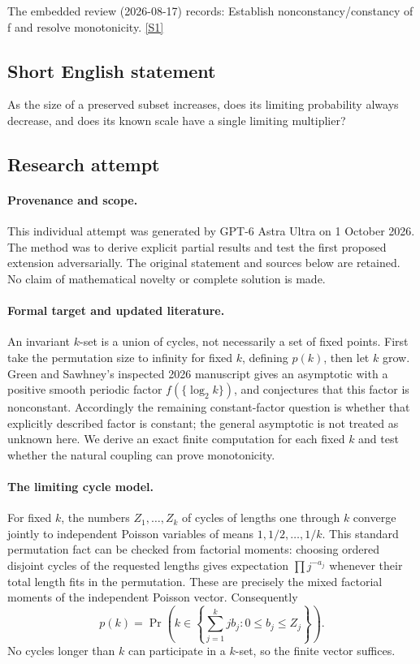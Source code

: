 \documentclass[11pt,a4paper]{article}
\newcommand{\sref}[2]{\hyperlink{source:#1:#2}{[S#2]}}
\begin{document}
The embedded review (2026-08-17) records: Establish nonconstancy/constancy of f and resolve monotonicity. \sref{statement}{1}

\subsection{Short English statement}

As the size of a preserved subset increases, does its limiting probability always decrease, and does its known scale have a single limiting multiplier?

\subsection{Research attempt}

\paragraph{Provenance and scope.}
This individual attempt was generated by GPT-6 Astra Ultra on 1 October 2026. The method was to derive explicit partial results and test the first proposed extension adversarially. The original statement and sources below are retained. No claim of mathematical novelty or complete solution is made.

\paragraph{Formal target and updated literature.}
An invariant $k$-set is a union of cycles, not necessarily a set of fixed points. First take the permutation size to infinity for fixed $k$, defining $p(k)$, then let $k$ grow. Green and Sawhney's inspected 2026 manuscript gives an asymptotic with a positive smooth periodic factor $f(\{\log_2k\})$, and conjectures that this factor is nonconstant. Accordingly the remaining constant-factor question is whether that explicitly described factor is constant; the general asymptotic is not treated as unknown here. We derive an exact finite computation for each fixed $k$ and test whether the natural coupling can prove monotonicity.

\paragraph{The limiting cycle model.}
For fixed $k$, the numbers $Z_1,\ldots,Z_k$ of cycles of lengths one through $k$ converge jointly to independent Poisson variables of means $1,1/2,\ldots,1/k$. This standard permutation fact can be checked from factorial moments: choosing ordered disjoint cycles of the requested lengths gives expectation $\prod j^{-a_j}$ whenever their total length fits in the permutation. These are precisely the mixed factorial moments of the independent Poisson vector. Consequently
\[
 p(k)=\Pr\left(k\in\left\{\sum_{j=1}^k j b_j:0\leq b_j\leq Z_j\right\}\right).
\]
No cycles longer than $k$ can participate in a $k$-set, so the finite vector suffices.
\end{document}
